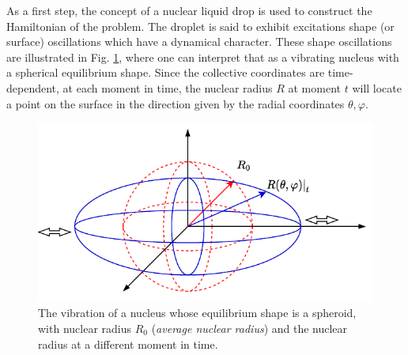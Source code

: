 As a first step, the concept of a nuclear liquid drop is used to construct the Hamiltonian of the problem. The droplet is said to exhibit excitations shape (or surface) oscillations which have a dynamical character. These shape oscillations are illustrated in Fig. \ref{fig-nuclear-vibration}, where one can interpret that as a vibrating nucleus with a spherical equilibrium shape. Since the collective coordinates are time-dependent, at each moment in time, the nuclear radius $R$ at moment $t$ will locate a point on the surface in the direction given by the radial coordinates $\theta,\varphi$.
\begin{figure}
    \centering
    \includegraphics[scale=1.1]{Chapters/Figures/shape_oscillations.pdf}
    \caption{The vibration of a nucleus whose equilibrium shape is a spheroid, with nuclear radius $R_0$ (\emph{average nuclear radius}) and the nuclear radius at a different moment in time.}
    \label{fig-nuclear-vibration}
\end{figure}

